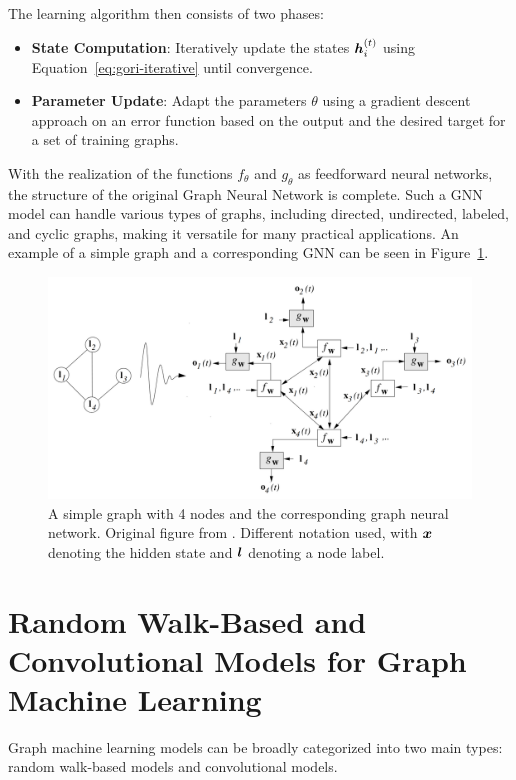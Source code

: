 The learning algorithm then consists of two phases:
\begin{itemize}
	\item \textbf{State Computation}: Iteratively update the states \( \bm{h}_i^{(t)} \) using Equation~\ref{eq:gori-iterative} until convergence.
	\item \textbf{Parameter Update}: Adapt the parameters \( \theta \) using a gradient descent approach on an error function based on the output and the desired target for a set of training graphs.
\end{itemize}
With the realization of the functions \( f_\theta \) and \( g_\theta \) as feedforward neural networks, the structure of the original Graph Neural Network is complete. Such a GNN model can handle various types of graphs, including directed, undirected, labeled, and cyclic graphs, making it versatile for many practical applications. An example of a simple graph and a corresponding GNN can be seen in Figure~\ref{fig:gori}.

\begin{figure}
	\includegraphics[width=\linewidth]{images/GNN-gori.png}
	\caption{A simple graph with 4 nodes and the corresponding graph neural network. Original figure from \cite{gori_new_2005}. Different notation used, with \( \bm{x} \) denoting the hidden state and \( \bm{l} \) denoting a node label.}
	\label{fig:gori}
\end{figure}

\section{Random Walk-Based and Convolutional Models for Graph Machine Learning}

Graph machine learning models can be broadly categorized into two main types: random walk-based models and convolutional models.

